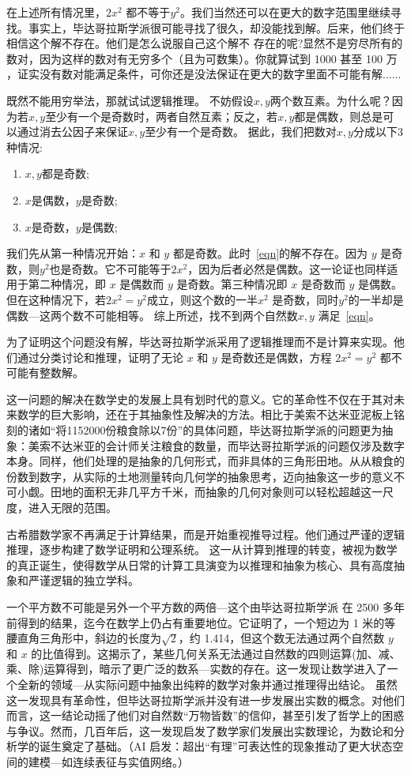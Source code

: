 在上述所有情况里，$2x^2$ 都不等于$y^2$。我们当然还可以在更大的数字范围里继续寻找。事实上，毕达哥拉斯学派很可能寻找了很久，却没能找到解。后来，他们终于相信这个解不存在。他们是怎么说服自己这个解不 存在的呢?显然不是穷尽所有的数对，因为这样的数对有{无穷多个（且为可数集）}。你就算试到 1000 甚至 100 万 ，证实没有数对能满足条件，可你还是没法保证在更大的数字里面不可能有解......

既然不能用穷举法，那就试试逻辑推理。 
不妨假设$x,y$两个数互素。为什么呢？因为若$x,y$至少有一个是奇数时，两者自然互素；反之，若$x,y$都是偶数，则总是可以通过消去公因子来保证$x,y$至少有一个是奇数。
据此，我们把数对$x,y$分成以下3种情况: 
\begin{enumerate}
\item $x,y$都是奇数;
\item $x$是偶数，$y$是奇数;
\item $x$是奇数，$y$是偶数;
\end{enumerate}

我们先从第一种情况开始：$x$ 和 $y$ 都是奇数。此时~\eqref{eqn}的解不存在。因为 $y$ 是奇数，则$y^2$也是奇数。它不可能等于$2x^2$，因为后者必然是偶数。这一论证也同样适用于第二种情况，即 $x$ 是偶数而 $y$ 是奇数。第三种情况即 $x$ 是奇数而 $y$ 是偶数。但在这种情况下，若$2x^2=y^2$成立，则这个数的一半$x^2$ 是奇数，同时$y^2$的一半却是偶数---这两个数不可能相等。
综上所述，找不到两个自然数$x,y$ 满足~\eqref{eqn}。

为了证明这个问题没有解，毕达哥拉斯学派采用了逻辑推理而不是计算来实现。他们通过分类讨论和推理，证明了无论 $x$ 和 $y$ 是奇数还是偶数，方程 $2x^2 = y^2$ 都不可能有整数解。

这一问题的解决在数学史的发展上具有划时代的意义。它的革命性不仅在于其对未来数学的巨大影响，还在于其抽象性及解决的方法。相比于美索不达米亚泥板上铭刻的诸如“将1152000份粮食除以7份”的具体问题，毕达哥拉斯学派的问题更为抽象：美索不达米亚的会计师关注粮食的数量，而毕达哥拉斯学派的问题仅涉及数字本身。同样，他们处理的是抽象的几何形式，而非具体的三角形田地。从从粮食的份数到数字，从实际的土地测量转向几何学的抽象思考，迈向抽象这一步的意义不可小觑。田地的面积无非几平方千米，而抽象的几何对象则可以轻松超越这一尺度，进入无限的范围。

古希腊数学家不再满足于计算结果，而是开始重视推导过程。他们通过严谨的逻辑推理，逐步构建了数学证明和公理系统。
这一从计算到推理的转变，被视为数学的真正诞生，使得数学从日常的计算工具演变为以推理和抽象为核心、具有高度抽象和严谨逻辑的独立学科。

一个平方数不可能是另外一个平方数的两倍---这个由毕达哥拉斯学派 在 2500 多年前得到的结果，迄今在数学上仍占有重要地位。它证明了，一个短边为 1 米的等腰直角三角形中，斜边的长度为$\sqrt{2}$，约 1.414，但这个数无法通过两个自然数 $y$ 和 $x$ 的比值得到。这揭示了，某些几何关系无法通过自然数的四则运算(加、减、乘、除)运算得到，暗示了更广泛的数系---实数的存在。这一发现让数学进入了一个全新的领域---从实际问题中抽象出纯粹的数学对象并通过推理得出结论。
虽然这一发现具有革命性，但毕达哥拉斯学派并没有进一步发展出实数的概念。对他们而言，这一结论动摇了他们对自然数“万物皆数”的信仰，甚至引发了哲学上的困惑与争议。然而，几百年后，这一发现启发了数学家们发展出实数理论，为数论和分析学的诞生奠定了基础。{（AI 启发：超出“有理”可表达性的现象推动了更大状态空间的建模---如连续表征与实值网络。）}

